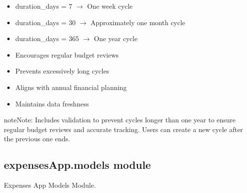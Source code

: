 \documentclass[letterpaper,10pt,english]{sphinxmanual}
\begin{document}
\begin{fulllineitems}
\begin{fulllineitems}
\begin{itemize}
\item {} 
\sphinxAtStartPar
duration\_days = 7 \(\rightarrow\) One week cycle

\item {} 
\sphinxAtStartPar
duration\_days = 30 \(\rightarrow\) Approximately one month cycle

\item {} 
\sphinxAtStartPar
duration\_days = 365 \(\rightarrow\) One year cycle

\end{itemize}
\begin{description}
\begin{itemize}
\item {} 
\sphinxAtStartPar
Encourages regular budget reviews

\item {} 
\sphinxAtStartPar
Prevents excessively long cycles

\item {} 
\sphinxAtStartPar
Aligns with annual financial planning

\item {} 
\sphinxAtStartPar
Maintains data freshness

\end{itemize}

\end{description}

\begin{sphinxadmonition}{note}{Note:}
\sphinxAtStartPar
Includes validation to prevent cycles longer than one year
to ensure regular budget reviews and accurate tracking.
Users can create a new cycle after the previous one ends.
\end{sphinxadmonition}

\end{fulllineitems}


\end{fulllineitems}



\subsection{expensesApp.models module}
\label{\detokenize{expensesApp:module-expensesApp.models}}\label{\detokenize{expensesApp:expensesapp-models-module}}
\sphinxAtStartPar
Expenses App Models Module.
\end{document}

